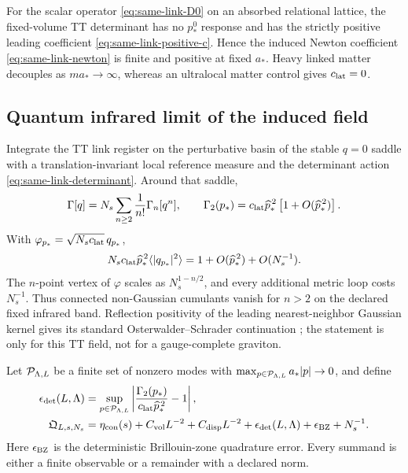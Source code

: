 \begin{theorem}
\label{thm:same-link-induced-kernel}
For the scalar operator \eqref{eq:same-link-D0} on an absorbed relational
lattice, the fixed-volume TT determinant has no \(p_*^0\) response and has the
strictly positive leading coefficient
\eqref{eq:same-link-positive-c}.  Hence the induced Newton coefficient
\eqref{eq:same-link-newton} is finite and positive at fixed \(a_*\).
Heavy linked matter decouples as \(ma_*\to\infty\), whereas an ultralocal
matter control gives \(c_{\rm lat}=0\).
\end{theorem}

\subsection{Quantum infrared limit of the induced field}

Integrate the TT link register on the perturbative basin of the stable
\(q=0\) saddle with a translation-invariant local reference measure and the
determinant action \eqref{eq:same-link-determinant}.  Around that saddle,
\begin{equation}
 \Gamma[q]
 =N_s\sum_{n\geq2}\frac1{n!}\Gamma_n[q^n],
 \qquad
 \Gamma_2(p_*)=c_{\rm lat}\widehat p_*^{\,2}
 \left[1+O(\widehat p_*^{\,2})\right].
 \label{eq:same-link-vertices}
\end{equation}
With \(\varphi_{p_*}=\sqrt{N_sc_{\rm lat}}\,q_{p_*}\),
\begin{equation}
 N_sc_{\rm lat}\widehat p_*^{\,2}
 \langle|q_{p_*}|^2\rangle
 =1+O(\widehat p_*^{\,2})+O(N_s^{-1}).
 \label{eq:same-link-covariance}
\end{equation}
The \(n\)-point vertex of \(\varphi\) scales as
\(N_s^{1-n/2}\), and every additional metric loop costs \(N_s^{-1}\).
Thus connected non-Gaussian cumulants vanish for \(n>2\) on the declared
fixed infrared band.  Reflection positivity of the leading
nearest-neighbor Gaussian kernel gives its standard
Osterwalder--Schrader continuation \cite{OsterwalderSchrader1973}; the
statement is only for this TT field, not for a gauge-complete graviton.

Let \({\cal P}_{\Lambda,L}\) be a finite set of nonzero modes with
\(\max_{p\in{\cal P}_{\Lambda,L}}a_*|p|\to0\), and define
\begin{align}
 \epsilon_{\rm det}(L,\Lambda)
 &=\sup_{p\in{\cal P}_{\Lambda,L}}
 \left|
 \frac{\Gamma_2(p_*)}
 {c_{\rm lat}\widehat p_*^{\,2}}-1
 \right|,\nonumber\\
 {\mathfrak Q}_{L,s,N_s}
 &=\eta_{\rm con}(s)+C_{\rm vol}L^{-2}
 +C_{\rm disp}L^{-2}
 +\epsilon_{\rm det}(L,\Lambda)
 +\epsilon_{\rm BZ}+N_s^{-1}.
 \label{eq:same-link-joint-certificate}
\end{align}
Here \(\epsilon_{\rm BZ}\) is the deterministic Brillouin-zone quadrature
error.  Every summand is either a finite observable or a remainder with a
declared norm.

